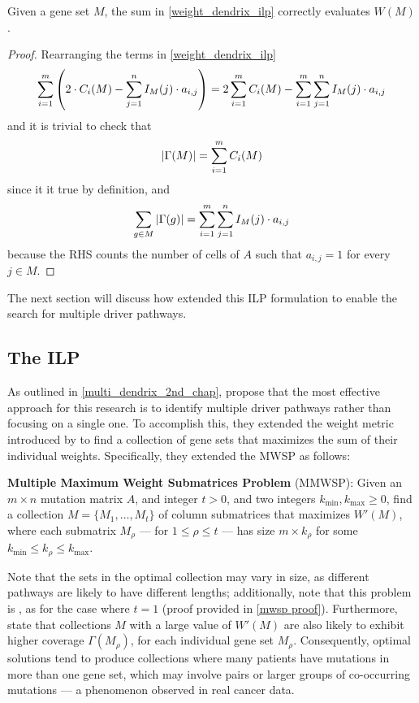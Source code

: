 \begin{lemma} Given a gene set $M$, the sum in \cref{weight_dendrix_ilp} correctly evaluates $W(M)$.
\end{lemma}

\begin{proof}
    Rearranging the terms in \cref{weight_dendrix_ilp} $$\sum_{i = 1}^m {\left(2 \cdot C_i(M) - \sum_{j = 1}^n I_M(j) \cdot a_{i, j}\right)} = 2\sum_{i = 1}^m {C_i(M)} - \sum_{i = 1}^m {\sum_{j = 1}^n {I_M(j) \cdot a_{i, j}}}$$ and it is trivial to check that $$\left|\Gamma(M)\right| = \sum_{i = 1}^m {C_i(M)}$$ since it it true by definition, and $$\sum_{g \in M}{\left|\Gamma(g)\right|} = \sum_{i = 1}^m {\sum_{j = 1}^n {I_M(j) \cdot a_{i, j}}}$$ because the RHS counts the number of cells of $A$ such that $a_{i, j} = 1$ for every $j \in M$.
\end{proof}

The next section will discuss how \textcite{multi-dendrix} extended this ILP formulation to enable the search for multiple driver pathways.

\subsection{The ILP}

As outlined in \cref{multi_dendrix_2nd_chap}, \textcite{multi-dendrix} propose that the most effective approach for this research is to identify multiple driver pathways rather than focusing on a single one. To accomplish this, they extended the weight metric introduced by \textcite{dendrix} to find a collection of gene sets that maximizes the sum of their individual weights. Specifically, they extended the MWSP as follows:

\begin{displayquote}
    \textbf{Multiple Maximum Weight Submatrices Problem} (MMWSP): Given an $m \times n$ mutation matrix $A$, and integer $t > 0$, and two integers $k_{\mathrm{min}}, k_{\mathrm{max}} \ge 0$, find a collection $M = \{M_1, \ldots, M_t\}$ of column submatrices that maximizes $W'(M)$, where each submatrix $M_\rho$ --- for $1 \le \rho \le t$ ---  has size $m \times k_\rho$ for some $k_{\mathrm{min}} \le k_\rho \le k_{\mathrm{max}}$.
\end{displayquote}

Note that the sets in the optimal collection may vary in size, as different pathways are likely to have different lengths; additionally, note that this problem is \NPComplete, as for the case where $t = 1$ (proof provided in \cref{mwsp proof}). Furthermore, \textcite{multi-dendrix} state that collections $M$ with a large value of $W'(M)$ are also likely to exhibit higher coverage $\Gamma(M_\rho)$, for each individual gene set $M_\rho$. Consequently, optimal solutions tend to produce collections where many patients have mutations in more than one gene set, which may involve pairs or larger groups of co-occurring mutations --- a phenomenon observed in real cancer data.

